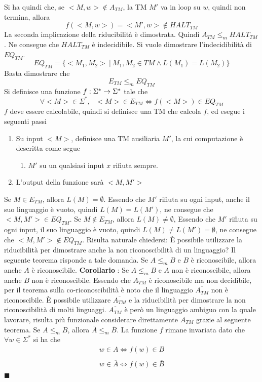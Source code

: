 \documentclass[10pt, letterpaper]{report}
\begin{document}
Si ha quindi che, se  $<M,w>\notin A_{TM}$, la TM $M'$ va in loop su $w$, quindi non termina, allora 
$$f(<M,w>)=<M',w>\notin HALT_{TM}$$La seconda implicazione della riducibilità è dimostrata. Quindi 
$ A_{TM}\le_m HALT_{TM}$. Ne consegue che $HALT_{TM}$ è indecidibile.
Si vuole dimostrare l'indecidibilità di $EQ_{TM}$. 
$$ EQ_{TM}=\{<M_1,M_2> \ | \ M_1,M_2\in TM\land L(M_1)=L(M_2) \}$$
Basta dimostrare che $$ E_{TM}\le_m  EQ_{TM}$$Si definisce una funzione ${f:\Sigma^*\rightarrow \Sigma^*}$ tale che 
$$ \forall <M>\in\Sigma^*, \ \ \ <M>\in E_{TM}\iff f(<M>)\in EQ_{TM}$$
$f$ deve essere calcolabile, quindi si definisce una TM che calcola $f$, ed esegue i seguenti passi 
\begin{enumerate}
    \item   Su input $<M>$, definisce una TM ausiliaria $M'$, la cui computazione è descritta come segue \begin{enumerate}
        \item $M'$ su un qualsiasi input $x$ rifiuta sempre.
    \end{enumerate}
    \item L'output della funzione sarà $<M,M'>$
\end{enumerate}
\boxedMath{$\implies$} Se $M\in E_{TM}$, allora $L(M)=\emptyset$. Essendo che $M'$ rifiuta su ogni input, anche il suo linguaggio è vuoto, quindi $L(M)=L(M')$, ne consegue che $<M,M'>\in EQ_{TM}$.
\acc \boxedMath{$\impliedby$} Se $M\notin E_{TM}$, allora $L(M)\ne \emptyset$, Essendo che $M'$ rifiuta su ogni input, il suo linguaggio è vuoto, quindi $L(M)\ne L(M') = \emptyset$, ne consegue che $<M,M'>\notin EQ_{TM}$.\acc 
Risulta naturale chiedersi: È possibile utilizzare la riducibilità per dimostrare anche la non riconoscibilità di un linguaggio? Il seguente teorema risponde a tale domanda. \acc 
\teo{} Se $A\le_m B$ e $B$ è riconoscibile, allora  anche $A$ è riconoscibile.\acc 
\textbf{Corollario} : Se $A\le_m B$ e $A$ non è riconoscibile, allora  anche $B$ non è riconoscibile.\acc 
Essendo che $A_{TM}$ è riconoscibile ma non decidibile, per il teorema sulla co-riconoscibilità è noto che il linguaggio $\overline{A_{TM}}$ non è riconoscibile. È possibile utilizzare $\overline{A_{TM}}$ e la riducibilità per dimostrare la non riconoscibilità di molti linguaggi. $\overline{A_{TM}}$  è però un linguaggio ambiguo con la quale lavorare, risulta più funzionale considerare direttamente $A_{TM}$ grazie al seguente teorema.\acc 
\teo{} Se $A\le_m B$, allora $\overline A\le_m \overline B$.\acc 
\dimo{} La funzione $f$ rimane invariata dato che $ \forall w\in\Sigma^*$ si ha che $$\begin{matrix}
    w\in A\iff f(w)\in B \\ \\ 
    w\in \overline A\iff f(w)\in \overline B 
\end{matrix} $$\hfill$\blacksquare$\acc 
\end{document}
